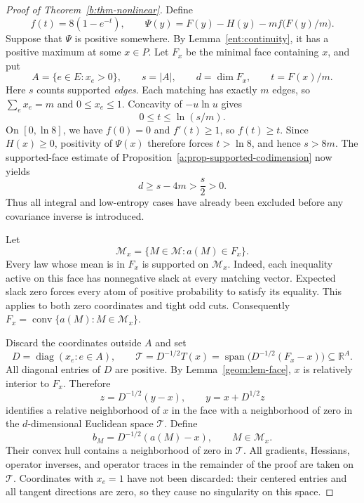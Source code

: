 \begin{proof}[Proof of Theorem~\ref{b:thm-nonlinear}]
Define
\[
 f(t)=8(1-e^{-t}),
 \qquad
 \Psi(y)=F(y)-H(y)-mf\bigl(F(y)/m\bigr).
\]
Suppose that \(\Psi\) is positive somewhere.  By
Lemma~\ref{ent:continuity}, it has a positive maximum at some
\(x\in P\).  Let \(F_x\) be the minimal face containing \(x\), and put
\[
 A=\{e\in E:x_e>0\},\qquad s=|A|,\qquad
 d=\dim F_x,\qquad t=F(x)/m.
\]
Here \(s\) counts supported \emph{edges}.  Each matching has exactly
\(m\) edges, so \(\sum_ex_e=m\) and \(0\le x_e\le1\).
Concavity of \(-u\ln u\) gives
\[
 0\le t\le\ln(s/m).
\]
On \([0,\ln8]\), we have \(f(0)=0\) and \(f'(t)\ge1\), so
\(f(t)\ge t\).  Since \(H(x)\ge0\), positivity of \(\Psi(x)\)
therefore forces \(t>\ln8\), and hence \(s>8m\).
The supported-face estimate of
Proposition~\ref{a:prop-supported-codimension} now yields
\begin{equation}
 d\ge s-4m>\frac{s}{2}>0.
 \label{b:eq-large-dimension}
\end{equation}
Thus all integral and low-entropy cases have already been excluded
before any covariance inverse is introduced.

Let
\[
 \mathcal M_x=\{M\in\mathcal M:a(M)\in F_x\}.
\]
Every law whose mean is in \(F_x\) is supported on \(\mathcal M_x\).
Indeed, each inequality active on this face has nonnegative slack at
every matching vector.  Expected slack zero forces every atom of
positive probability to satisfy its equality.  This applies to both
zero coordinates and tight odd cuts.  Consequently
\(F_x=\operatorname{conv}\{a(M):M\in\mathcal M_x\}\).

Discard the coordinates outside \(A\) and set
\begin{equation}
 D=\operatorname{diag}(x_e:e\in A),\qquad
 \mathcal T=D^{-1/2}T(x)
     =\operatorname{span}\bigl(D^{-1/2}(F_x-x)\bigr)
       \subseteq\mathbb R^A.
 \label{b:eq-normalization}
\end{equation}
All diagonal entries of \(D\) are positive.  By
Lemma~\ref{geom:lem-face}, \(x\) is relatively interior to \(F_x\).
Therefore
\[
 z=D^{-1/2}(y-x),\qquad y=x+D^{1/2}z
\]
identifies a relative neighborhood of \(x\) in the face with a
neighborhood of zero in the \(d\)-dimensional Euclidean space
\(\mathcal T\).  Define
\[
 b_M=D^{-1/2}(a(M)-x),\qquad M\in\mathcal M_x.
\]
Their convex hull contains a neighborhood of zero in \(\mathcal T\).
All gradients, Hessians, operator inverses, and operator traces in
the remainder of the proof are taken on \(\mathcal T\).
Coordinates with \(x_e=1\) have not been discarded: their centered
entries and all tangent directions are zero, so they cause no
singularity on this space.


\end{proof}
